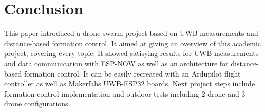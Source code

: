 \documentclass[conference]{IEEEtran}
\begin{document}
\section{Conclusion}

This paper introduced a drone swarm project based on UWB measurements and distance-based formation control. It aimed at giving an overview of this academic project, covering every topic. It showed satisying results for UWB measurements and data communication with ESP-NOW as well as an architecture for distance-based formation control. It can be easily recreated with an Ardupilot flight controller as well as Makerfabs UWB-ESP32 boards. Next project steps include formation control implementation and outdoor tests including 2 drone and 3 drone configurations.

\newpage 

\printbibliography[heading=bibintoc, title={References}]
\end{document}

